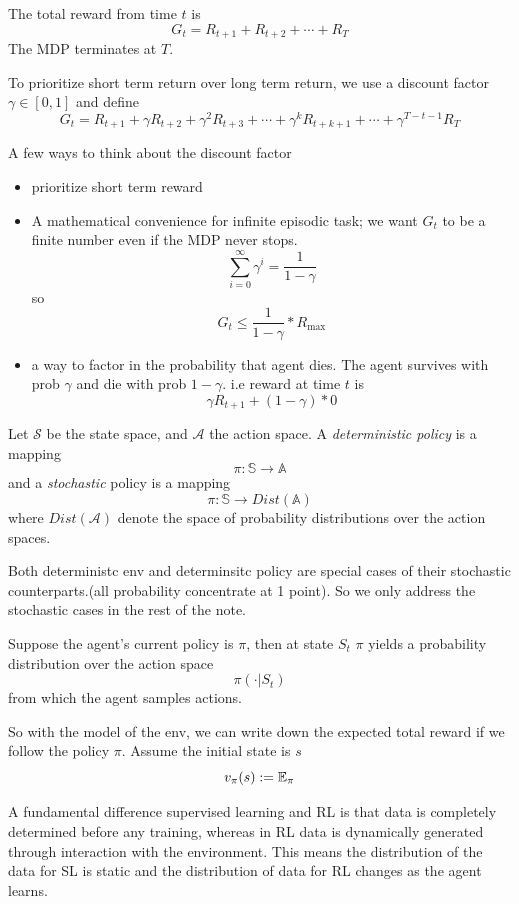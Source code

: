 \documentclass{article}
\begin{document}
The total reward from time $t$ is 
\[
    G_t = R_{t+1} + R_{t+2} + \cdots + R_{T}
\]
The MDP terminates at $T$. 

To prioritize short term return over long term return, we use a 
discount factor $\gamma \in [0, 1]$ and define
\[
    G_t = R_{t+1} + \gamma R_{t+2} + \gamma^2 R_{t+3} + \cdots 
    + \gamma^k R_{t+k+1} + \cdots + \gamma^{T-t-1}R_{T}
\]

A few ways to think about the discount factor
\begin{itemize}
    \item prioritize short term reward
    \item A mathematical convenience for infinite episodic task; we 
        want $G_t$ to be a finite number even if the MDP never stops.
        \[
            \sum_{i=0}^{\infty} \gamma^i = \frac{1}{1-\gamma}
        \]
        so 
        \[
            G_t \le \frac{1}{1-\gamma} * R_{\max}
        \]
    \item a way to factor in the probability that agent dies. The agent 
        survives with prob $\gamma$ and die with prob $1 - \gamma$.
        i.e reward at time $t$ is 
        \[
            \gamma R_{t+1} + (1 - \gamma) * 0
        \]
\end{itemize}

Let $\mathscr{S}$ be the state space, and $\mathscr{A}$ the action space.
A \emph{deterministic policy} is a mapping 
\[
    \pi: \mathbb{S} \rightarrow \mathbb{A}
\]
and a \emph{stochastic} policy is a mapping
\[
    \pi: \mathbb{S} \rightarrow Dist( \mathbb{A} )
\]
where $Dist(\mathscr{ A })$ denote the space of probability distributions
over the action spaces.

Both deterministc env and determinsitc policy are special cases of their
stochastic counterparts.(all probability concentrate at 1 point). So 
we only address the stochastic cases in the rest of the note.

Suppose the agent's current policy is $\pi$, then at state $S_t$
$\pi$ yields a probability distribution over the action space
\[
    \pi(\cdot | S_t)
\]
from which the agent samples actions. 

So with the model of the env, we can write down the expected total 
reward if we follow the policy $\pi$. Assume the initial state is $s$
\[
    v_{\pi}(s) := \mathbb{E}_{\pi}
\]


A fundamental difference supervised learning and RL is that data is 
completely determined before any training, whereas in RL data is
dynamically generated through interaction with the environment. 
This means the distribution of the data for SL is static and the 
distribution of data for RL changes as the agent learns. 
\end{document}

